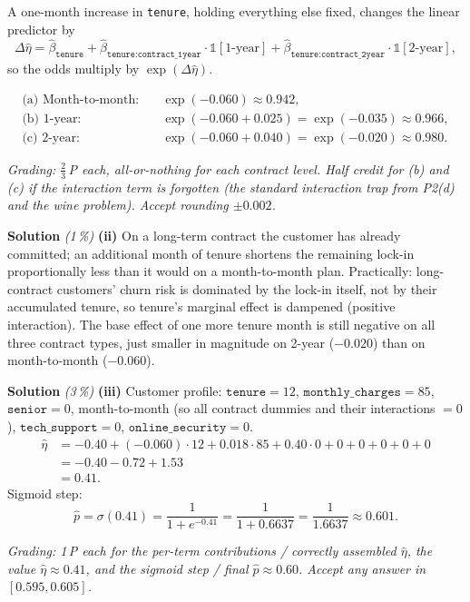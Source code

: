 \documentclass[11pt,a4paper]{article}
\newcommand{\subpoints}[1]{\textit{(#1\,\%)}}
\newcommand{\sol}{\noindent\textbf{Solution}}
\begin{document}
A one-month increase in \texttt{tenure}, holding everything else fixed, changes the linear
predictor by
$$\Delta\hat\eta = \hat\beta_{\texttt{tenure}}
   + \hat\beta_{\texttt{tenure:contract\_1year}}\cdot\mathbb 1[\text{1-year}]
   + \hat\beta_{\texttt{tenure:contract\_2year}}\cdot\mathbb 1[\text{2-year}],$$
so the odds multiply by $\exp(\Delta\hat\eta)$.

\begin{align*}
\text{(a) Month-to-month:}\quad &\exp(-0.060) \approx \boxed{0.942}, \\
\text{(b) 1-year:}\quad &\exp(-0.060 + 0.025) = \exp(-0.035) \approx \boxed{0.966}, \\
\text{(c) 2-year:}\quad &\exp(-0.060 + 0.040) = \exp(-0.020) \approx \boxed{0.980}.
\end{align*}

\noindent\emph{Grading: $\tfrac{2}{3}$\,P each, all-or-nothing for each contract level. Half credit
for (b) and (c) if the interaction term is forgotten (the standard interaction trap from P2(d) and
the wine problem). Accept rounding $\pm 0.002$.}

\medskip
\sol{} \subpoints{1} \textbf{(ii)} On a long-term contract the customer has already committed; an
additional month of tenure shortens the remaining lock-in proportionally less than it would on a
month-to-month plan. Practically: long-contract customers' churn risk is dominated by the lock-in
itself, not by their accumulated tenure, so tenure's marginal effect is dampened (positive
interaction). The base effect of one more tenure month is still negative on all three contract
types, just smaller in magnitude on 2-year ($-0.020$) than on month-to-month ($-0.060$).

\medskip
\sol{} \subpoints{3} \textbf{(iii)} Customer profile: $\texttt{tenure}=12$,
$\texttt{monthly\_charges}=85$, $\texttt{senior}=0$, month-to-month (so all contract dummies and
their interactions $=0$), $\texttt{tech\_support}=0$, $\texttt{online\_security}=0$.
\begin{align*}
\hat\eta &= -0.40 + (-0.060)\cdot 12 + 0.018\cdot 85 + 0.40\cdot 0 + 0 + 0 + 0 + 0 + 0 \\
   &= -0.40 - 0.72 + 1.53 \\
   &= \boxed{0.41}.
\end{align*}
Sigmoid step:
$$\hat p = \sigma(0.41) = \frac{1}{1+e^{-0.41}} = \frac{1}{1+0.6637}
   = \frac{1}{1.6637} \approx \boxed{0.601}.$$

\noindent\emph{Grading: 1\,P each for the per-term contributions / correctly assembled $\hat\eta$,
the value $\hat\eta \approx 0.41$, and the sigmoid step / final $\hat p \approx 0.60$. Accept any
answer in $[0.595, 0.605]$.}
\end{document}
